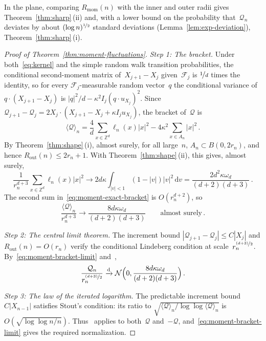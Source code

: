 \documentclass[11pt]{amsart}
\theoremstyle{plain}
\theoremstyle{definition}
\newcommand{\Z}{\mathbb Z}
\newcommand{\drift}{\kappa}
\newcommand{\dd}{\,\mathrm d}
\newcommand{\nf}{\nicefrac}
\newcommand{\Rout}{R_{\mathrm{out}}}
\newcommand{\Rmom}{R_{\mathrm{mom}}}
\numberwithin{equation}{section}
\begin{document}
In the plane, comparing $\Rmom(n)$ with the inner and outer radii gives Theorem~\ref{thm:sharp}\,(ii) and, with a lower bound on the probability that~$\mathcal Q_n$ deviates by about $(\log n)^{\nf12}$ standard deviations (Lemma~\ref{lem:exp-deviation}), Theorem~\ref{thm:sharp}\,(i).

\begin{proof}[Proof of Theorem~\ref{thm:moment-fluctuations}]
\emph{Step 1: The bracket.} Under both~\eqref{eq:kernel} and the simple random walk transition probabilities, the conditional second-moment matrix of~$X_{j+1}-X_j$ given~$\mathcal F_j$ is $\nf1d$ times the identity, so for every $\mathcal F_j$-measurable random vector~$q$ the conditional variance of $q\cdot(X_{j+1}-X_j)$ is $|q|^2/d-\drift^2I_j(q\cdot u_{X_j})^2$. Since $\mathcal Q_{j+1}-\mathcal Q_j=2X_j\cdot(X_{j+1}-X_j+\drift I_ju_{X_j})$, the bracket of~$\mathcal Q$ is
\begin{equation}\label{eq:moment-exact-bracket}
\langle\mathcal Q\rangle_n=\frac4d\sum_{x\in\Z^d}\ell_n(x)|x|^2-4\drift^2\sum_{x\in A_n}|x|^2\, .
\end{equation}
By Theorem~\ref{thm:shape}\,(i), almost surely, for all large~$n$, $A_n\subset B(0,2r_n)$, and hence $\Rout(n)\leq2r_n+1$. With Theorem~\ref{thm:shape}\,(ii), this gives, almost surely,
\begin{equation*}
\frac1{r_n^{d+3}}\sum_{x\in\Z^d}\ell_n(x)|x|^2\longrightarrow
2d\drift\int_{|v|<1}(1-|v|)|v|^2\dd v=\frac{2d^2\drift\omega_d}{(d+2)(d+3)}\, .
\end{equation*}
The second sum in~\eqref{eq:moment-exact-bracket} is $O(r_n^{d+2})$, so
\begin{equation}\label{eq:moment-bracket-limit}
\frac{\langle\mathcal Q\rangle_n}{r_n^{d+3}}\longrightarrow\frac{8d\drift\omega_d}{(d+2)(d+3)}
\qquad\text{almost surely}\, .
\end{equation}

\emph{Step 2: The central limit theorem.} The increment bound $|\mathcal Q_{j+1}-\mathcal Q_j|\leq C|X_j|$ and $\Rout(n)=O(r_n)$ verify the conditional Lindeberg condition at scale~$r_n^{\nf{(d+3)}{2}}$. By~\eqref{eq:moment-bracket-limit} and~\citet[Corollary~3.1]{HallHeyde1980},
\begin{equation*}
\frac{\mathcal Q_n}{r_n^{\nf{(d+3)}{2}}}\xrightarrow{\mathrm d}\mathcal N\Bigl(0,\frac{8d\drift\omega_d}{(d+2)(d+3)}\Bigr)\, .
\end{equation*}

\emph{Step 3: The law of the iterated logarithm.} The predictable increment bound $C|X_{n-1}|$ satisfies Stout's condition: its ratio to $\sqrt{\langle\mathcal Q\rangle_n/\log\log\langle\mathcal Q\rangle_n}$ is $O(\sqrt{\log\log n/n})$. Thus~\citet{Stout1970} applies to both~$\mathcal Q$ and~$-\mathcal Q$, and~\eqref{eq:moment-bracket-limit} gives the required normalization.


\end{proof}
\end{document}
